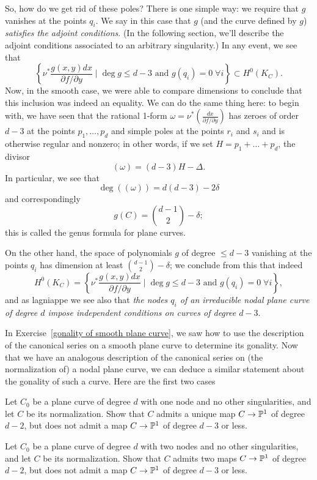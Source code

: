 So, how do we get rid of these poles? There is one simple way: we require that $g$ vanishes at the points $q_i$. We say in this case that $g$ (and the curve defined by $g$) \emph{satisfies the adjoint conditions}. (In the following section, we'll describe the adjoint conditions associated to an arbitrary singularity.) In any event, we see that
$$
 \left\{ \nu^* \frac{g(x,y)dx}{\partial f/\partial y} \mid \deg g \leq d-3 \text{ and } g(q_i) = 0 \; \forall i \right\} \subset H^0(K_C).
$$
Now, in the smooth case, we were able to compare dimensions to conclude that this inclusion was indeed an equality. We can do the same thing here: to begin with, we have seen that the  rational 1-form $\omega = \nu^*(\frac{dx}{\partial f/\partial y})$ has zeroes of order $d-3$ at the points $p_1,\dots,p_d$ and simple poles at the points $r_i$ and $s_i$ and is otherwise regular and nonzero; in other words, if we set $H = p_1+\dots + p_d$, the divisor
$$
(\omega) = (d-3)H - \Delta.
$$
In particular, we see that
$$
\deg((\omega)) = d(d-3) - 2\delta
$$
and correspondingly
$$
g(C) = \binom{d-1}{2} - \delta;
$$
this is called the genus formula for plane curves.

On the other hand, the space of polynomials $g$ of degree $\leq d-3$ vanishing at the points $q_i$ has dimension at least $ \binom{d-1}{2} - \delta$; we conclude from this that indeed
$$
H^0(K_C) =  \left\{ \nu^* \frac{g(x,y)dx}{\partial f/\partial y} \mid \deg g \leq d-3 \text{ and } g(q_i) = 0 \; \forall i \right\},
$$
and as lagniappe we see also that \emph{the nodes $q_i$ of an irreducible nodal plane curve of degree $d$ impose independent conditions on curves of degree $d-3$}.

In Exercise~\ref{gonality of smooth plane curve}, we saw how to use the description of the canonical series on a smooth plane curve to determine its gonality. Now that we have an analogous description of the canonical series on (the normalization of) a nodal plane curve, we can deduce a similar statement about the gonality of such a curve. Here are the first two cases  

\begin{exercise}
Let $C_0$ be a plane curve of degree $d$ with one node and no other singularities, and let $C$ be its normalization. Show that $C$ admits a unique map $C \to {\mathbb P}^1$ of degree $d-2$, but does not admit a map $C \to {\mathbb P}^1$ of degree $d-3$ or less.
\end{exercise}

\begin{exercise}
Let $C_0$ be a plane curve of degree $d$ with two nodes and no other singularities, and let $C$ be its normalization. Show that $C$ admits two maps $C \to {\mathbb P}^1$ of degree $d-2$, but does not admit a map $C \to {\mathbb P}^1$ of degree $d-3$ or less.
\end{exercise}


